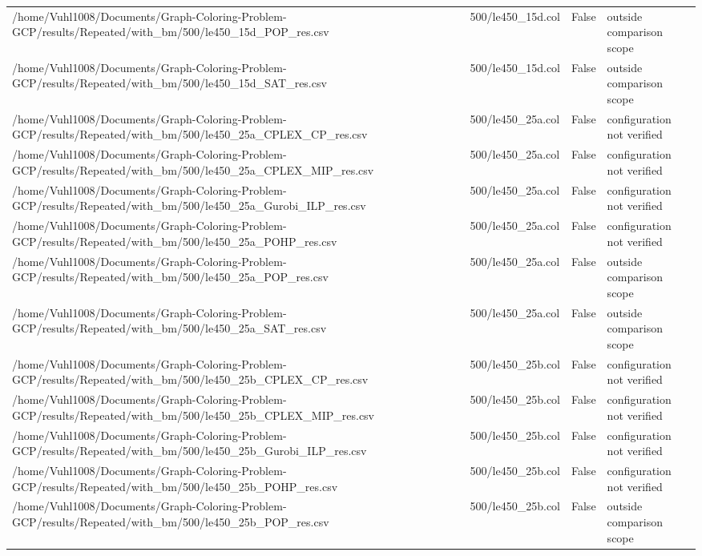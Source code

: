 \begin{table}[htbp]
\begin{tabular}{llll}
/home/Vuhl1008/Documents/Graph-Coloring-Problem-GCP/results/Repeated/with\_bm/500/le450\_15d\_POP\_res.csv & 500/le450\_15d.col & False & outside comparison scope \\
/home/Vuhl1008/Documents/Graph-Coloring-Problem-GCP/results/Repeated/with\_bm/500/le450\_15d\_SAT\_res.csv & 500/le450\_15d.col & False & outside comparison scope \\
/home/Vuhl1008/Documents/Graph-Coloring-Problem-GCP/results/Repeated/with\_bm/500/le450\_25a\_CPLEX\_CP\_res.csv & 500/le450\_25a.col & False & configuration not verified \\
/home/Vuhl1008/Documents/Graph-Coloring-Problem-GCP/results/Repeated/with\_bm/500/le450\_25a\_CPLEX\_MIP\_res.csv & 500/le450\_25a.col & False & configuration not verified \\
/home/Vuhl1008/Documents/Graph-Coloring-Problem-GCP/results/Repeated/with\_bm/500/le450\_25a\_Gurobi\_ILP\_res.csv & 500/le450\_25a.col & False & configuration not verified \\
/home/Vuhl1008/Documents/Graph-Coloring-Problem-GCP/results/Repeated/with\_bm/500/le450\_25a\_POHP\_res.csv & 500/le450\_25a.col & False & configuration not verified \\
/home/Vuhl1008/Documents/Graph-Coloring-Problem-GCP/results/Repeated/with\_bm/500/le450\_25a\_POP\_res.csv & 500/le450\_25a.col & False & outside comparison scope \\
/home/Vuhl1008/Documents/Graph-Coloring-Problem-GCP/results/Repeated/with\_bm/500/le450\_25a\_SAT\_res.csv & 500/le450\_25a.col & False & outside comparison scope \\
/home/Vuhl1008/Documents/Graph-Coloring-Problem-GCP/results/Repeated/with\_bm/500/le450\_25b\_CPLEX\_CP\_res.csv & 500/le450\_25b.col & False & configuration not verified \\
/home/Vuhl1008/Documents/Graph-Coloring-Problem-GCP/results/Repeated/with\_bm/500/le450\_25b\_CPLEX\_MIP\_res.csv & 500/le450\_25b.col & False & configuration not verified \\
/home/Vuhl1008/Documents/Graph-Coloring-Problem-GCP/results/Repeated/with\_bm/500/le450\_25b\_Gurobi\_ILP\_res.csv & 500/le450\_25b.col & False & configuration not verified \\
/home/Vuhl1008/Documents/Graph-Coloring-Problem-GCP/results/Repeated/with\_bm/500/le450\_25b\_POHP\_res.csv & 500/le450\_25b.col & False & configuration not verified \\
/home/Vuhl1008/Documents/Graph-Coloring-Problem-GCP/results/Repeated/with\_bm/500/le450\_25b\_POP\_res.csv & 500/le450\_25b.col & False & outside comparison scope \\

\end{tabular}
\end{table}
